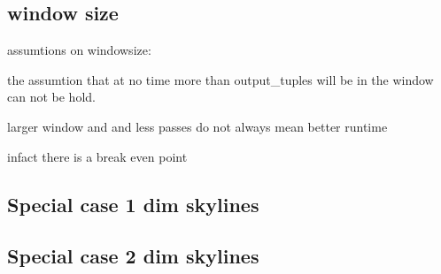 \subsection{window size}
assumtions on windowsize:

the assumtion that at no time more than output\_tuples will be in the
window can not be hold.

larger window and and less passes do not always mean better runtime

infact there is a break even point

\subsection{Special case 1 dim skylines}


\subsection{Special case 2 dim skylines}


